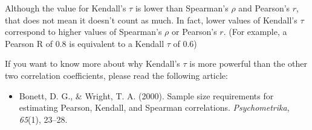 \documentclass[11pt]{article}
\providecommand{\tightlist}{%
      \setlength{\itemsep}{0pt}\setlength{\parskip}{0pt}}
\begin{document}
    Although the value for Kendall's \(\tau\) is lower than Spearman's
\(\rho\) and Pearson's \(r\), that does not mean it doesn't count as
much. In fact, lower values of Kendall's \(\tau\) correspond to higher
values of Spearman's \(\rho\) or Pearson's \(r\). (For example, a
Pearson R of 0.8 is equivalent to a Kendall \(\tau\) of 0.6)

If you want to know more about why Kendall's \(\tau\) is more powerful
than the other two correlation coefficients, please read the following
article:

\begin{itemize}
\tightlist
\item
  Bonett, D. G., \& Wright, T. A. (2000). Sample size requirements for
  estimating Pearson, Kendall, and Spearman correlations.
  \emph{Psychometrika}, \emph{65}(1), 23--28.
\end{itemize}

    


    
    
    
    
\end{document}
